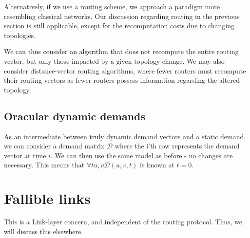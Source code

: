 \documentclass{amsart}
\begin{document}
    Alternatively, if we use a routing scheme, we approach a paradigm more resembling classical networks. Our discussion regarding routing in the previous section is still applicable, except for the recomputation costs due to changing topologies.

    We can thus consider an algorithm that does not recompute the entire routing vector, but only those impacted by a given topology change. We may also consider distance-vector routing algorithms, where fewer routers must recompute their routing vectors as fewer routers possess information regarding the altered topology.

    \subsection{Oracular dynamic demands}

    As an intermediate between truly dynamic demand vectors and a static demand, we can consider a demand matrix \(\mathcal{D}\) where the i'th row represents the demand vector at time \(i\). We can then use the same model as before - no changes are necessary. This means that \(\forall t u, v \mathcal{D}(u, v, t)\) is known at \(t = 0\).

    \section{Fallible links}

    This is a Link-layer concern, and independent of the routing protocol. Thus, we will discuss this elsewhere.
\end{document}
